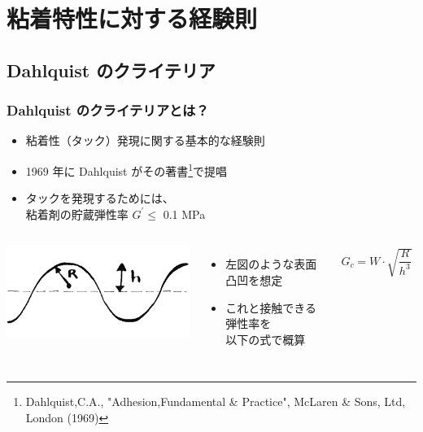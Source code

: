 \documentclass[12pt, dvipdfmx]{beamer}
\begin{document}
\section{粘着特性に対する経験則}
\subsection{Dahlquist のクライテリア}
\setcounter{footnote}{0}
\begin{frame}
	\frametitle{Dahlquist のクライテリアとは？}
			\begin{itemize}
				\item 粘着性（タック）発現に関する基本的な経験則
				\item 1969 年に Dahlquist がその著書\footnote{Dahlquist,C.A., "Adhesion,Fundamental \& Practice", McLaren \& Sons, Ltd, London (1969)}で提唱
				\item タックを発現するためには、\\\alert{粘着剤の貯蔵弾性率 $G^{\prime} \leq$ 0.1 MPa }
			\end{itemize}

			\begin{columns}[c, onlytextwidth]
						\centering
							\includegraphics[width=\textwidth]{Dahlquist.png}
					\begin{itemize}
						\item 左図のような表面凸凹を想定
						\item これと接触できる弾性率を\\以下の式で概算
					\end{itemize}

					\vspace{-6mm}
					\begin{align*}
						G_c = W \cdot \sqrt{\dfrac{R}{h^3}}
					\end{align*}
			\end{columns}
\end{frame}
\end{document}

